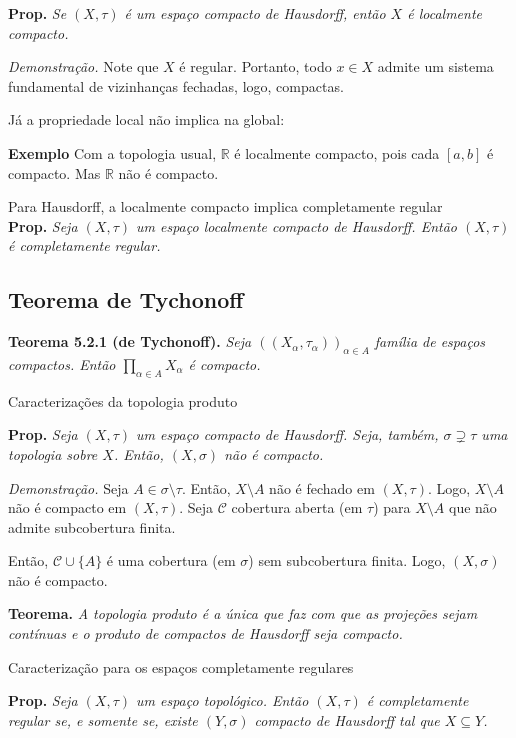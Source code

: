 \documentclass{article}
\begin{document}
\begin{landscape}
\begin{multicols}{3}
\textbf{Prop.} \textit{Se $(X, \tau)$ é um espaço compacto de Hausdorff, então $X$ é localmente compacto.}\medskip

\textit{Demonstração.} Note que $X$ é regular. Portanto, todo $x \in X$ admite um sistema fundamental de vizinhanças fechadas, logo, compactas.   \medskip

\color{blue!70}Já a propriedade local não implica na global:\color{black}

\textbf{Exemplo} Com a topologia usual, $\mathbb{R}$ é localmente compacto, pois cada $[a, b]$ é compacto. Mas $\mathbb{R}$ não é compacto.\medskip

\color{blue!70}Para Hausdorff, a localmente compacto implica completamente regular\color{black}\\
\textbf{Prop.} \textit{Seja $(X, \tau)$ um espaço localmente compacto de Hausdorff. Então $(X, \tau)$ é completamente regular.}


\subsection{Teorema de Tychonoff}
\textbf{Teorema 5.2.1 (de Tychonoff).} \textit{Seja \(((X_\alpha, \tau_\alpha))_{\alpha \in A}\) família de espaços compactos. Então \(\prod_{\alpha \in A} X_\alpha\) é compacto.}\medskip

\colorbox{cinza}{Caracterizações da topologia produto}\medskip

\textbf{Prop.}\textit{ Seja $(X, \tau)$ um espaço compacto de Hausdorff. Seja, também, $\sigma \supsetneq \tau$ uma topologia sobre $X$. Então, $(X, \sigma)$ não é compacto.}

\textit{Demonstração.} Seja $A \in \sigma \setminus \tau$. Então, $X \setminus A$ não é fechado em $(X, \tau)$. Logo, $X \setminus A$ não é compacto em $(X, \tau)$. Seja $\mathcal{C}$ cobertura aberta (em $\tau$) para $X \setminus A$ que não admite subcobertura finita.

Então, $\mathcal{C} \cup \{A\}$ é uma cobertura (em $\sigma$) sem subcobertura finita. Logo, $(X, \sigma)$ não é compacto.\medskip   


\textbf{Teorema.} \textit{A topologia produto é a única que faz com que as projeções sejam contínuas e o produto de compactos de Hausdorff seja compacto.}\medskip

\colorbox{cinza}{Caracterização para os espaços completamente regulares}\medskip

\textbf{Prop.} \textit{Seja $(X, \tau)$ um espaço topológico. Então $(X, \tau)$ é completamente regular se, e somente se, existe $(Y, \sigma)$ compacto de Hausdorff tal que $X \subseteq Y$.}\medskip


\end{multicols}
\end{landscape}
\end{document}

